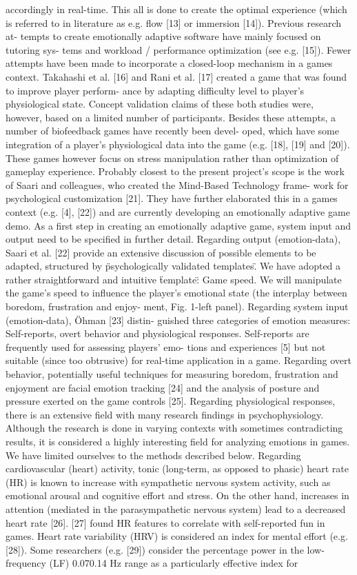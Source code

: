 \documentclass{uofsthesis-cs}
\begin{document}
accordingly in real-time. This all is done to create the optimal experience (which is referred to in literature as e.g. flow [13] or immersion [14]). Previous research at- tempts to create emotionally adaptive software have mainly focused on tutoring sys- tems and workload / performance optimization (see e.g. [15]). Fewer attempts have been made to incorporate a closed-loop mechanism in a games context. Takahashi et al. [16] and Rani et al. [17] created a game that was found to improve player perform- ance by adapting difficulty level to player's physiological state. Concept validation claims of these both studies were, however, based on a limited number of participants. Besides these attempts, a number of biofeedback games have recently been devel- oped, which have some integration of a player's physiological data into the game (e.g. [18], [19] and [20]). These games however focus on stress manipulation rather than optimization of gameplay experience. Probably closest to the present project's scope is the work of Saari and colleagues, who created the Mind-Based Technology frame- work for psychological customization [21]. They have further elaborated this in a games context (e.g. [4], [22]) and are currently developing an emotionally adaptive game demo. As a first step in creating an emotionally adaptive game, system input and output need to be specified in further detail. Regarding output (emotion-data), Saari et al. [22] provide an extensive discussion of possible elements to be adapted, structured by \"psychologically validated templates\". We have adopted a rather straightforward and intuitive \"template\": Game speed. We will manipulate the game's speed to influence the player's emotional state (the interplay between boredom, frustration and enjoy- ment, Fig. 1-left panel). Regarding system input (emotion-data), Öhman [23] distin- guished three categories of emotion measures: Self-reports, overt behavior and physiological responses. Self-reports are frequently used for assessing players' emo- tions and experiences [5] but not suitable (since too obtrusive) for real-time application in a game. Regarding overt behavior, potentially useful techniques for measuring boredom, frustration and enjoyment are facial emotion tracking [24] and the analysis of posture and pressure exerted on the game controls [25]. Regarding physiological responses, there is an extensive field with many research findings in psychophysiology. Although the research is done in varying contexts with sometimes contradicting results, it is considered a highly interesting field for analyzing emotions in games. We have limited ourselves to the methods described below. Regarding cardiovascular (heart) activity, tonic (long-term, as opposed to phasic) heart rate (HR) is known to increase with sympathetic nervous system activity, such as emotional arousal and cognitive effort and stress. On the other hand, increases in attention (mediated in the parasympathetic nervous system) lead to a decreased heart rate [26]. [27] found HR features to correlate with self-reported fun in games. Heart rate variability (HRV) is considered an index for mental effort (e.g. [28]). Some researchers (e.g. [29]) consider the percentage power in the low-frequency (LF) 0.070.14 Hz range as a particularly effective index for 
\end{document}
